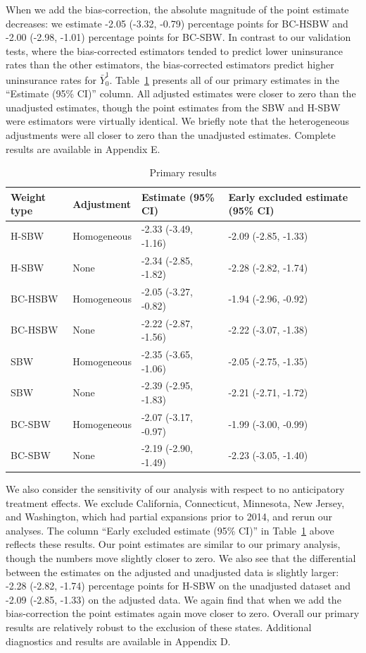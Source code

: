 \documentclass[aoas]{imsart}
\theoremstyle{plain}
\theoremstyle{remark}
\begin{document}
When we add the bias-correction, the absolute magnitude of the point estimate decreases: we estimate -2.05 (-3.32, -0.79) percentage points for BC-HSBW and -2.00 (-2.98, -1.01) percentage points for BC-SBW. In contrast to our validation tests, where the bias-corrected estimators tended to predict lower uninsurance rates than the other estimators, the bias-corrected estimators predict higher uninsurance rates for $\bar{Y}^1_0$. Table~\ref{tab:mainresults} presents all of our primary estimates in the ``Estimate (95\% CI)'' column. All adjusted estimates were closer to zero than the unadjusted estimates, though the point estimates from the SBW and H-SBW were estimators were virtually identical. We briefly note that the heterogeneous adjustments were all closer to zero than the unadjusted estimates. Complete results are available in Appendix E.

\begin{table}[ht]\label{tab:mainresults}
\caption{Primary results}
\begin{tabular}{llll}
  \hline
Weight type & Adjustment & Estimate (95\% CI) & Early excluded estimate (95\% CI) \\ 
  \hline
H-SBW & Homogeneous & -2.33 (-3.49, -1.16) & -2.09 (-2.85, -1.33) \\ 
  H-SBW & None & -2.34 (-2.85, -1.82) & -2.28 (-2.82, -1.74) \\ 
  BC-HSBW & Homogeneous & -2.05 (-3.27, -0.82) & -1.94 (-2.96, -0.92) \\ 
  BC-HSBW & None & -2.22 (-2.87, -1.56) & -2.22 (-3.07, -1.38) \\ 
  SBW & Homogeneous & -2.35 (-3.65, -1.06) & -2.05 (-2.75, -1.35) \\ 
  SBW & None & -2.39 (-2.95, -1.83) & -2.21 (-2.71, -1.72) \\ 
  BC-SBW & Homogeneous & -2.07 (-3.17, -0.97) & -1.99 (-3.00, -0.99) \\ 
  BC-SBW & None & -2.19 (-2.90, -1.49) & -2.23 (-3.05, -1.40) \\ 
   \hline
\end{tabular}
\end{table}

We also consider the sensitivity of our analysis with respect to no anticipatory treatment effects. We exclude California, Connecticut, Minnesota, New Jersey, and Washington, which had partial expansions prior to 2014, and rerun our analyses. The column ``Early excluded estimate (95\% CI)'' in Table~\ref{tab:mainresults} above reflects these results. Our point estimates are similar to our primary analysis, though the numbers move slightly closer to zero. We also see that the differential between the estimates on the adjusted and unadjusted data is slightly larger: -2.28 (-2.82, -1.74) percentage points for H-SBW on the unadjusted dataset and -2.09 (-2.85, -1.33) on the adjusted data. We again find that when we add the bias-correction the point estimates again move closer to zero. Overall our primary results are relatively robust to the exclusion of these states. Additional diagnostics and results are available in Appendix D.
\end{document}
